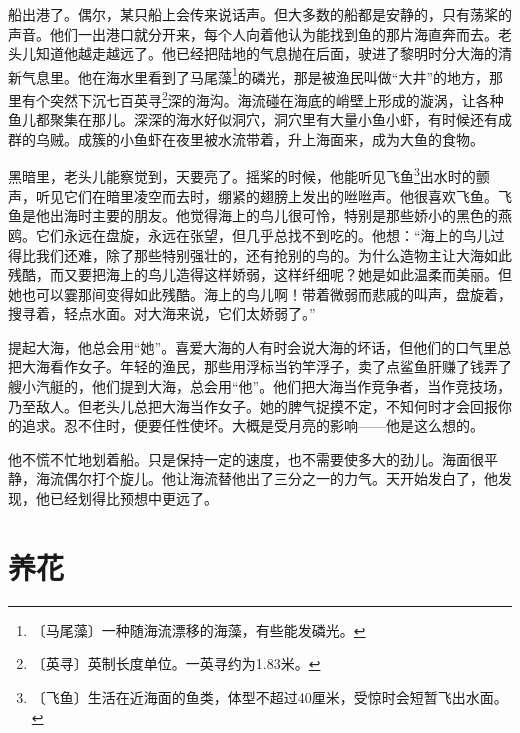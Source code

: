 \documentclass[12pt,UTF-8,openany]{ctexbook}
\begin{document}
\begin{large}
    
    船出港了。偶尔，某只船上会传来说话声。但大多数的船都是安静的，只有荡桨的声音。他们一出港口就分开来，每个人向着他认为能找到鱼的那片海直奔而去。老头儿知道他越走越远了。他已经把陆地的气息抛在后面，驶进了黎明时分大海的清新气息里。他在海水里看到了马尾藻\footnote{〔马尾藻〕一种随海流漂移的海藻，有些能发磷光。}的磷光，那是被渔民叫做“大井”的地方，那里有个突然下沉七百英寻\footnote{〔英寻〕英制长度单位。一英寻约为1.83米。}深的海沟。海流碰在海底的峭壁上形成的漩涡，让各种鱼儿都聚集在那儿。深深的海水好似洞穴，洞穴里有大量小鱼小虾，有时候还有成群的乌贼。成簇的小鱼虾在夜里被水流带着，升上海面来，成为大鱼的食物。
    
    黑暗里，老头儿能察觉到，天要亮了。摇桨的时候，他能听见飞鱼\footnote{〔飞鱼〕生活在近海面的鱼类，体型不超过40厘米，受惊时会短暂飞出水面。}出水时的颤声，听见它们在暗里凌空而去时，绷紧的翅膀上发出的咝咝声。他很喜欢飞鱼。飞鱼是他出海时主要的朋友。他觉得海上的鸟儿很可怜，特别是那些娇小的黑色的燕鸥。它们永远在盘旋，永远在张望，但几乎总找不到吃的。他想：“海上的鸟儿过得比我们还难，除了那些特别强壮的，还有抢别的鸟的。为什么造物主让大海如此残酷，而又要把海上的鸟儿造得这样娇弱，这样纤细呢？她是如此温柔而美丽。但她也可以霎那间变得如此残酷。海上的鸟儿啊！带着微弱而悲戚的叫声，盘旋着，搜寻着，轻点水面。对大海来说，它们太娇弱了。”
    
    提起大海，他总会用“她”。喜爱大海的人有时会说大海的坏话，但他们的口气里总把大海看作女子。年轻的渔民，那些用浮标当钓竿浮子，卖了点鲨鱼肝赚了钱弄了艘小汽艇的，他们提到大海，总会用“他”。他们把大海当作竞争者，当作竞技场，乃至敌人。但老头儿总把大海当作女子。她的脾气捉摸不定，不知何时才会回报你的追求。忍不住时，便要任性使坏。大概是受月亮的影响——他是这么想的。
    
    他不慌不忙地划着船。只是保持一定的速度，也不需要使多大的劲儿。海面很平静，海流偶尔打个旋儿。他让海流替他出了三分之一的力气。天开始发白了，他发现，他已经划得比预想中更远了。
    
\end{large}



\chapter{养花}
\end{document}
